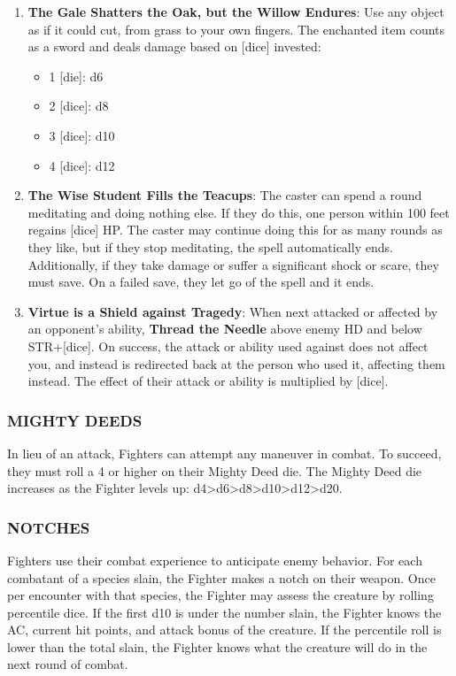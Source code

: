 \documentclass[twoside]{article}
\newcommand{\TTN}[2]{\textbf{Thread the Needle} above #1 and below #2}
\begin{document}
\begin{enumerate}[nosep]
\item \textbf{The Gale Shatters the Oak, but the Willow Endures}: Use any object as if it could cut, from grass to your own fingers. The enchanted item counts as a sword and deals damage based on [dice] invested:
\begin{itemize}[nosep]
\item 1 [die]: d6
\item 2 [dice]: d8
\item 3 [dice]: d10
\item 4 [dice]: d12
\end{itemize}
\item \textbf{The Wise Student Fills the Teacups}: The caster can spend a round meditating and doing nothing else. If they do this, one person within 100 feet regains [dice] HP. The caster may continue doing this for as many rounds as they like, but if they stop meditating, the spell automatically ends. Additionally, if they take damage or suffer a significant shock or scare, they must save. On a failed save, they let go of the spell and it ends.
\item \textbf{Virtue is a Shield against Tragedy}: When next attacked or affected by an opponent's ability, \TTN{enemy HD}{STR+[dice]}. On success, the attack or ability used against does not affect you, and instead is redirected back at the person who used it, affecting them instead. The effect of their attack or ability is multiplied by [dice].
\label{fight:num}
\end{enumerate}

\subsubsection*{\footnotesize{M}\scriptsize{IGHTY} \footnotesize{D}\scriptsize{EEDS}\normalsize}

In lieu of an attack, Fighters can attempt any maneuver in combat. To succeed, they must roll a 4 or higher on their Mighty Deed die. The Mighty Deed die increases as the Fighter levels up: d4>d6>d8>d10>d12>d20.

\subsubsection*{\footnotesize{N}\scriptsize{OTCHES}\normalsize}

Fighters use their combat experience to anticipate enemy behavior. For each combatant of a species slain, the Fighter makes a notch on their weapon. Once per encounter with that species, the Fighter may assess the creature by rolling percentile dice. If the first d10 is under the number slain, the Fighter knows the AC, current hit points, and attack bonus of the creature. If the percentile roll is lower than the total slain, the Fighter knows what the creature will do in the next round of combat.
\end{document}
